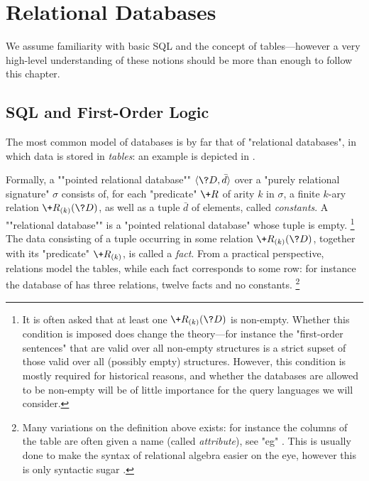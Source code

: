 \section{Relational Databases}
\label{sec:prelim-db-relational}

We assume familiarity with basic SQL and the concept of tables---however 
a very high-level understanding of these notions should be more than enough
to follow this chapter.

\subsection{SQL and First-Order Logic}

The most common model of databases is by far that of "relational databases",
in which data is stored in \emph{tables}: an example is depicted
in .

\begin{table}
	\centering%
	
	\caption{
		\AP\label{fig:relational-database-cinema}
		A "relational database" consisting of three tables, representing data
		stored by a cinema. (Replica of .)
	}
\end{table}
\bigskip

Formally, a \AP""pointed relational database"" $\tup{\?D, \bar d}$
over a "purely relational signature" $\sigma$
consists of, for each "predicate" $\+R$ of arity $k$ in $\sigma$,
a finite $k$-ary relation $\+R_{(k)}(\?D)$, as well as a tuple $\bar d$ of elements,
called \emph{constants}.
A \AP""relational database"" is a "pointed relational database" whose tuple is empty.%
\footnote{It is often asked that at least one $\+R_{(k)}(\?D)$ is non-empty.
Whether this condition is imposed does change the theory---for instance the "first-order sentences"
that are valid over all non-empty structures is a strict supset of
those valid over all (possibly empty) structures.
However, this condition is mostly required for historical reasons,
and whether the databases are allowed to be non-empty
will be of little importance for the query languages we will consider.}
The data consisting of a tuple occurring in some relation $\+R_{(k)}(\?D)$, together with
its "predicate" $\+R_{(k)}$, is called a \emph{fact}.
From a practical perspective, relations model the tables,
while each fact corresponds to some row: for 
instance the database of 
has three relations, twelve facts and no constants.%
\footnote{Many variations on the definition above exists:
for instance the columns of the table are often given a name (called \emph{attribute}),
see "eg" \cite[\S\!\S~3.1--3.2]{AbiteboulHullVianu1995Databases}.
This is usually done to make the syntax of relational algebra easier on the eye,
however this is only syntactic sugar \cite[Proposition~5.1.2]{AbiteboulHullVianu1995Databases}.}

